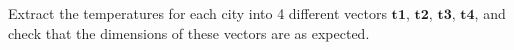 Extract the temperatures for each city into 4 different vectors $\boldsymbol{t1}$, $\boldsymbol{t2}$, $\boldsymbol{t3}$, $\boldsymbol{t4}$, and check that the dimensions of these vectors are as expected.

\begin{solution}\ \\

\end{solution}